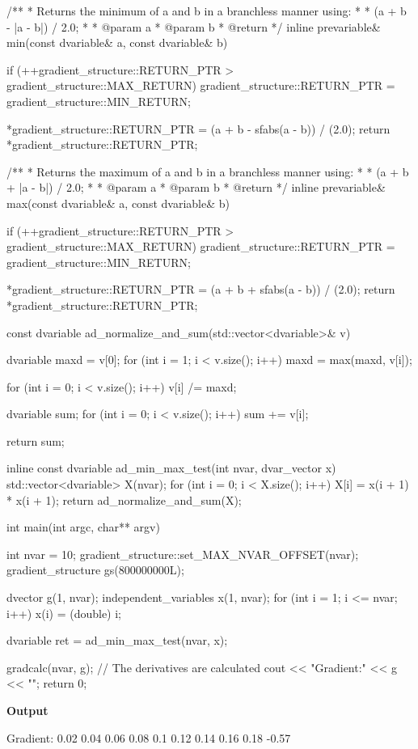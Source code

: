 \documentclass[oneside]{article}
\begin{document}
\begin{cppsource}
/**
 * Returns the minimum of a and b in a branchless manner using:
 *
 * (a + b - |a - b|) / 2.0;
 *
 * @param a
 * @param b
 * @return
 */
inline prevariable& min(const dvariable& a, const dvariable& b) {
    if (++gradient_structure::RETURN_PTR > gradient_structure::MAX_RETURN)
        gradient_structure::RETURN_PTR = gradient_structure::MIN_RETURN;

    *gradient_structure::RETURN_PTR = (a + b - sfabs(a - b)) / (2.0);
    return *gradient_structure::RETURN_PTR;
}

/**
 * Returns the maximum of a and b in a branchless manner using:
 *
 * (a + b + |a - b|) / 2.0;
 *
 * @param a
 * @param b
 * @return
 */
inline prevariable& max(const dvariable& a, const dvariable& b) {
    if (++gradient_structure::RETURN_PTR > gradient_structure::MAX_RETURN)
        gradient_structure::RETURN_PTR = gradient_structure::MIN_RETURN;

    *gradient_structure::RETURN_PTR = (a + b + sfabs(a - b)) / (2.0);
    return *gradient_structure::RETURN_PTR;
}

const dvariable ad_normalize_and_sum(std::vector<dvariable>& v) {
    dvariable maxd = v[0];
    for (int i = 1; i < v.size(); i++) {
        maxd = max(maxd, v[i]);
    }

    for (int i = 0; i < v.size(); i++) {
        v[i] /= maxd;
    }

    dvariable sum;
    for (int i = 0; i < v.size(); i++) {
        sum += v[i];
    }

    return sum;
}
\end{cppsource}

\begin{cppsource}
inline const dvariable ad_min_max_test(int nvar, dvar_vector x) {
    std::vector<dvariable> X(nvar);
    for (int i = 0; i < X.size(); i++) {
        X[i] = x(i + 1) * x(i + 1);
    }
    return ad_normalize_and_sum(X);
}

int main(int argc, char** argv) {

    int nvar = 10;
    gradient_structure::set_MAX_NVAR_OFFSET(nvar);
    gradient_structure gs(800000000L);

    dvector g(1, nvar);
    independent_variables x(1, nvar);
    for (int i = 1; i <= nvar; i++) {
        x(i) = (double) i;
    }

    dvariable ret = ad_min_max_test(nvar, x);

    gradcalc(nvar, g); // The derivatives are calculated
    cout << "Gradient:\n" << g << "\n";
    return 0;
}
\end{cppsource}

\textbf{Output}
\begin{myoutput}
Gradient:
0.02 0.04 0.06 0.08 0.1 0.12 0.14 0.16 0.18 -0.57
\end{myoutput}
\end{document}
